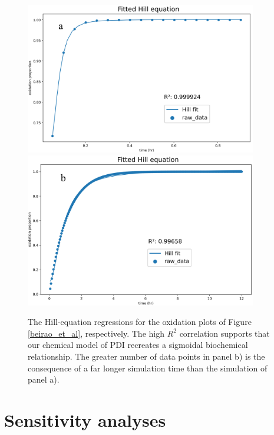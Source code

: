 \begin{figure}
    \centering
    \includegraphics[width = 0.9\textwidth]{images/PDIpy/examples/20uM_regression.png}
    \vspace{5mm}
    \midrule
    \vspace{5mm}
    \includegraphics[width = 0.9\textwidth]{images/PDIpy/examples/10uM_biofilm_regression.png}
    \caption{
        The Hill-equation regressions for the oxidation plots of Figure \ref{beirao_et_al}, respectively. The high $R^2$ correlation supports that our chemical model of PDI recreates a sigmoidal biochemical relationship. The greater number of data points in panel b) is the consequence of a far longer simulation time than the simulation of panel a).
    }
    \label{hill_regression}
\end{figure}


\section{Sensitivity analyses}

